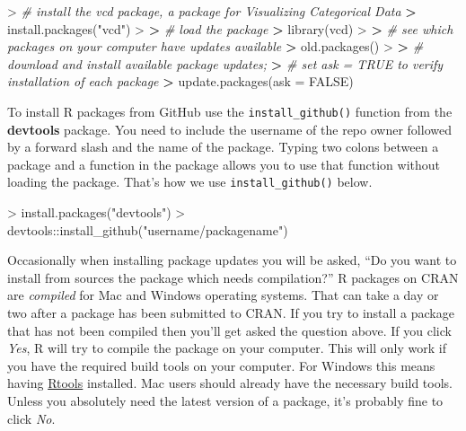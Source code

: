 \documentclass[
]{book}
\newenvironment{Shaded}{\begin{snugshade}}{\end{snugshade}}
\newcommand{\AttributeTok}[1]{\textcolor[rgb]{0.77,0.63,0.00}{#1}}
\newcommand{\CommentTok}[1]{\textcolor[rgb]{0.56,0.35,0.01}{\textit{#1}}}
\newcommand{\ConstantTok}[1]{\textcolor[rgb]{0.00,0.00,0.00}{#1}}
\newcommand{\ErrorTok}[1]{\textcolor[rgb]{0.64,0.00,0.00}{\textbf{#1}}}
\newcommand{\FunctionTok}[1]{\textcolor[rgb]{0.00,0.00,0.00}{#1}}
\newcommand{\NormalTok}[1]{#1}
\newcommand{\SpecialCharTok}[1]{\textcolor[rgb]{0.00,0.00,0.00}{#1}}
\newcommand{\StringTok}[1]{\textcolor[rgb]{0.31,0.60,0.02}{#1}}
\begin{document}
\begin{Shaded}
\begin{Highlighting}[]
\SpecialCharTok{\textgreater{}} \CommentTok{\# install the vcd package, a package for Visualizing Categorical Data}
\ErrorTok{\textgreater{}} \FunctionTok{install.packages}\NormalTok{(}\StringTok{"vcd"}\NormalTok{)}
\SpecialCharTok{\textgreater{}} 
\ErrorTok{\textgreater{}} \CommentTok{\# load the package}
\ErrorTok{\textgreater{}} \FunctionTok{library}\NormalTok{(vcd)}
\SpecialCharTok{\textgreater{}} 
\ErrorTok{\textgreater{}} \CommentTok{\# see which packages on your computer have updates available}
\ErrorTok{\textgreater{}} \FunctionTok{old.packages}\NormalTok{()}
\SpecialCharTok{\textgreater{}} 
\ErrorTok{\textgreater{}} \CommentTok{\# download and install available package updates;}
\ErrorTok{\textgreater{}} \CommentTok{\# set ask = TRUE to verify installation of each package}
\ErrorTok{\textgreater{}} \FunctionTok{update.packages}\NormalTok{(}\AttributeTok{ask =} \ConstantTok{FALSE}\NormalTok{)}
\end{Highlighting}
\end{Shaded}

To install R packages from GitHub use the \texttt{install\_github()} function from the \textbf{devtools} package. You need to include the username of the repo owner followed by a forward slash and the name of the package. Typing two colons between a package and a function in the package allows you to use that function without loading the package. That's how we use \texttt{install\_github()} below.

\begin{Shaded}
\begin{Highlighting}[]
\SpecialCharTok{\textgreater{}} \FunctionTok{install.packages}\NormalTok{(}\StringTok{"devtools"}\NormalTok{)}
\SpecialCharTok{\textgreater{}}\NormalTok{ devtools}\SpecialCharTok{::}\FunctionTok{install\_github}\NormalTok{(}\StringTok{"username/packagename"}\NormalTok{)}
\end{Highlighting}
\end{Shaded}

Occasionally when installing package updates you will be asked, ``Do you want to install from sources the package which needs compilation?'' R packages on CRAN are \emph{compiled} for Mac and Windows operating systems. That can take a day or two after a package has been submitted to CRAN. If you try to install a package that has not been compiled then you'll get asked the question above. If you click \emph{Yes}, R will try to compile the package on your computer. This will only work if you have the required build tools on your computer. For Windows this means having \href{https://cran.r-project.org/bin/windows/Rtools/}{Rtools} installed. Mac users should already have the necessary build tools. Unless you absolutely need the latest version of a package, it's probably fine to click \emph{No}.
\end{document}
